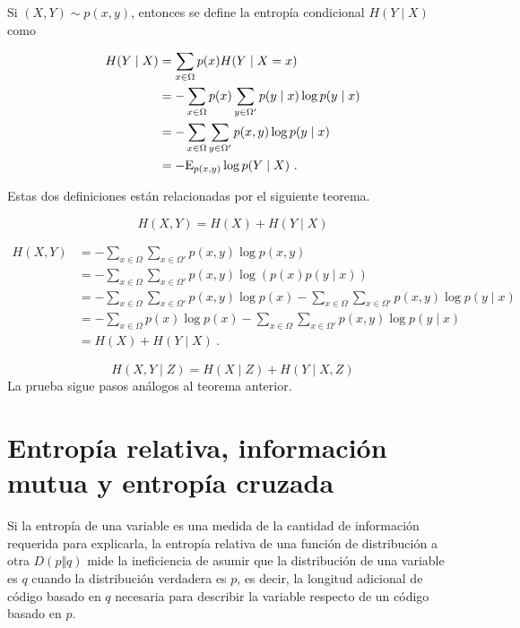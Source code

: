 
Si \((X,Y)\sim p(x,y)\), entonces se define la entropía condicional
\(H(Y\mid X)\) como

\begin{align}
  H(Y\mid X) &= \sum_{x\in\Omega}p(x)H(Y\mid X=x)\\
             &= -\sum_{x\in\Omega}p(x)\sum_{y\in\Omega'}p(y\mid x) \log p(y \mid x)\\
             &= -\sum_{x\in\Omega}\sum_{y\in\Omega'}p(x,y) \log p(y \mid x)\\
             &= -\mathrm{E}_{p(x,y)} \log p(Y \mid X)~.
\end{align}


Estas dos definiciones están relacionadas por el siguiente teorema.

\[H(X,Y)=H(X)+H(Y\mid X)\]

\proofb

\begin{align*}
  H(X,Y)&=-\sum_{x\in\Omega}\sum_{x\in\Omega'}p(x,y)\log p(x,y)\\
        &=-\sum_{x\in\Omega}\sum_{x\in\Omega'}p(x,y)\log\left(p(x)p(y\mid x)\right)\\
        &=-\sum_{x\in\Omega}\sum_{x\in\Omega'}p(x,y)\log p(x) - \sum_{x\in\Omega}\sum_{x\in\Omega'}p(x,y)\log p(y\mid x)\\
        &=-\sum_{x\in\Omega}p(x)\log p(x) - \sum_{x\in\Omega}\sum_{x\in\Omega'}p(x,y)\log p(y\mid x)\\
        &=H(X)+H(Y\mid X)~.
\end{align*}

\proofe
\theoe

\corb
\[H(X,Y\mid Z)=H(X\mid Z)+H(Y\mid X,Z)\] \proofb
La prueba sigue pasos análogos al teorema anterior. \proofe
\core

\section{Entropía relativa, información mutua y entropía
cruzada}\label{entropuxeda-relativa-informaciuxf3n-mutua-y-entropuxeda-cruzada}

Si la entropía de una variable es una medida de la cantidad de
información requerida para explicarla, la entropía relativa de una
función de distribución a otra \(D(p\Vert q)\) mide la ineficiencia de
asumir que la distribución de una variable es \(q\) cuando la
distribución verdadera es \(p\), es decir, la longitud adicional de
código basado en \(q\) necesaria para describir la variable respecto de
un código basado en \(p\).

